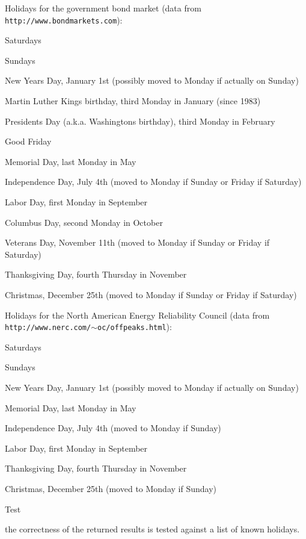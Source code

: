 Holidays for the government bond market (data from {\tt http\+://www.\+bondmarkets.\+com})\+: 
\begin{DoxyItemize}
\item Saturdays 
\item Sundays 
\item New Year\textquotesingle{}s Day, January 1st (possibly moved to Monday if actually on Sunday) 
\item Martin Luther King\textquotesingle{}s birthday, third Monday in January (since 1983) 
\item Presidents\textquotesingle{} Day (a.\+k.\+a. Washington\textquotesingle{}s birthday), third Monday in February 
\item Good Friday 
\item Memorial Day, last Monday in May 
\item Independence Day, July 4th (moved to Monday if Sunday or Friday if Saturday) 
\item Labor Day, first Monday in September 
\item Columbus Day, second Monday in October 
\item Veterans\textquotesingle{} Day, November 11th (moved to Monday if Sunday or Friday if Saturday) 
\item Thanksgiving Day, fourth Thursday in November 
\item Christmas, December 25th (moved to Monday if Sunday or Friday if Saturday) 
\end{DoxyItemize}

Holidays for the North American Energy Reliability Council (data from {\tt http\+://www.\+nerc.\+com/$\sim$oc/offpeaks.\+html})\+: 
\begin{DoxyItemize}
\item Saturdays 
\item Sundays 
\item New Year\textquotesingle{}s Day, January 1st (possibly moved to Monday if actually on Sunday) 
\item Memorial Day, last Monday in May 
\item Independence Day, July 4th (moved to Monday if Sunday) 
\item Labor Day, first Monday in September 
\item Thanksgiving Day, fourth Thursday in November 
\item Christmas, December 25th (moved to Monday if Sunday) 
\end{DoxyItemize}

\begin{DoxyRefDesc}{Test}
\item[{\bf Test}]the correctness of the returned results is tested against a list of known holidays. \end{DoxyRefDesc}


